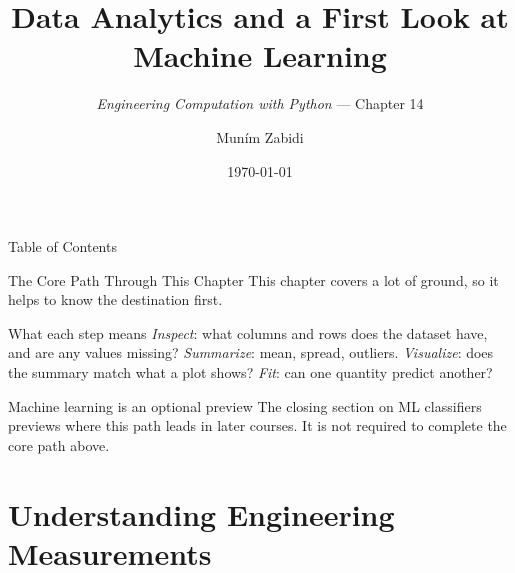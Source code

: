 \documentclass[9pt,aspectratio=169,xcolor=table]{beamer}
\title{Data Analytics and a First Look at Machine Learning}
\subtitle{\emph{Engineering Computation with Python} --- Chapter 14}
\author{Mun\'{i}m Zabidi}
\institute{\color{primary}Faculty of Electrical Engineering, Universiti Teknologi Malaysia}
\date{\today}
\begin{document}
\titlepage

\begin{frame}{Table of Contents}
    \tableofcontents
\end{frame}

\begin{frame}{The Core Path Through This Chapter}
    \leavevmode
    This chapter covers a lot of ground, so it helps to know the
    destination first.

    \vspace{3mm}
    \begin{center}
    \end{center}

    \vspace{3mm}
    \begin{block}{What each step means}
        \small
        \emph{Inspect}: what columns and rows does the dataset have, and
        are any values missing? \quad
        \emph{Summarize}: mean, spread, outliers. \quad
        \emph{Visualize}: does the summary match what a plot shows?
        \quad \emph{Fit}: can one quantity predict another?
    \end{block}

    \vspace{2mm}
    \begin{alertblock}{Machine learning is an optional preview}
        The closing section on ML classifiers previews where this path
        leads in later courses. It is \alert{not required} to complete
        the core path above.
    \end{alertblock}
\end{frame}

\section{Understanding Engineering Measurements}
\end{document}
